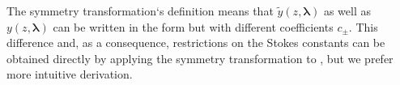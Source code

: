 \documentclass[12pt]{iopart}
\def\f{\hat{f}}
\def\g{\hat{g}}
\def\h{\hat{h}}
\def\L{\widehat{L}}
\def\lmbd{\bm{\lambda}}
\def\unity{\hat{\it 1}}
\begin{document}
The symmetry transformation`s definition  means that 
$\tilde{y}(z,\lmbd)$ as well as $y(z,\lmbd)$ can be written in the form 
but with different coefficients $c_\pm$. This difference and, as a consequence, 
restrictions on the Stokes constants can be obtained directly by applying
the symmetry transformation to , but we prefer more intuitive derivation.

%
\end{document}
